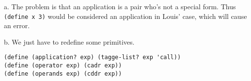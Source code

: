 \documentclass[a4paper,12pt]{article}
\newcommand{\subpar}[1]{\medskip \noindent #1.}
\begin{document}
\subpar{a}  The problem is that an application is a pair who's not a
special form.  Thus \lstinline!(define x 3)! would be considered an
application in Louis' case, which will cause an error.

\subpar{b}  We just have to redefine some primitives.
\begin{lstlisting}
(define (application? exp) (tagge-list? exp 'call))
(define (operator exp) (cadr exp))
(define (operands exp) (cddr exp))
\end{lstlisting}
\end{document}
